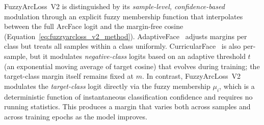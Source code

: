 \begin{table}[ht!]
\centering
\small
\caption{Comparison of margin modulation strategies. $\cos\theta_y$ denotes the cosine similarity to the correct class. $\bar{c}_k$ is the class-level average difficulty in AdaptiveFace.}
\label{tab:margin_comparison}
\end{table}

FuzzyArcLoss~V2 is distinguished by its \emph{sample-level, confidence-based} modulation through an explicit fuzzy membership function that interpolates between the full ArcFace logit and the margin-free cosine (Equation~\ref{eq:fuzzyarcloss_v2_method}).
AdaptiveFace~\cite{liu2019adaptiveface} adjusts margins per class but treats all samples within a class uniformly.
CurricularFace~\cite{huang2020curricularface} is also per-sample, but it modulates \emph{negative-class} logits based on an adaptive threshold $t$ (an exponential moving average of target cosine) that evolves during training; the target-class margin itself remains fixed at $m$.
In contrast, FuzzyArcLoss~V2 modulates the \emph{target-class} logit directly via the fuzzy membership $\mu_i$, which is a deterministic function of instantaneous classification confidence and requires no running statistics.
This produces a margin that varies both across samples and across
training epochs as the model improves.

